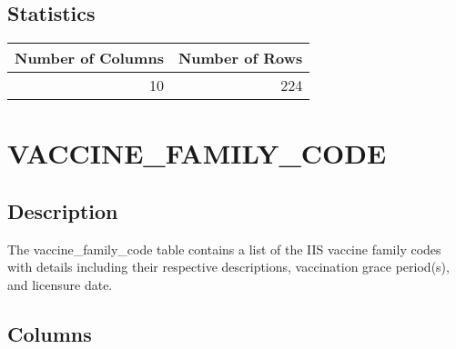 \documentclass[
  letterpaper,
  DIV=11,
  numbers=noendperiod]{scrreprt}
\begin{document}
\hypertarget{statistics-46}{%
\section*{Statistics}\label{statistics-46}}

\begin{longtable}{rr}
\toprule
Number of Columns & Number of Rows \\ 
\midrule
10 & 224 \\ 
\bottomrule
\end{longtable}

\hypertarget{vaccine_family_code}{%
\chapter*{VACCINE\_FAMILY\_CODE}\label{vaccine_family_code}}

\hypertarget{description-47}{%
\section*{Description}\label{description-47}}

The vaccine\_family\_code table contains a list of the IIS vaccine
family codes with details including their respective descriptions,
vaccination grace period(s), and licensure date.

\hypertarget{columns-47}{%
\section*{Columns}\label{columns-47}}
\end{document}
